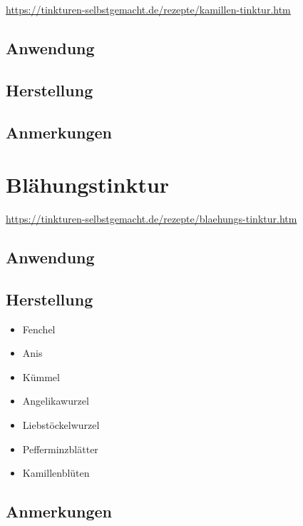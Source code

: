 
\cite{tinkturen}

\url{https://tinkturen-selbstgemacht.de/rezepte/kamillen-tinktur.htm}

\subsection{Anwendung}
\subsection{Herstellung}
\subsection{Anmerkungen}



\newpage



\section{Blähungstinktur}


\cite{tinkturen}  

\url{https://tinkturen-selbstgemacht.de/rezepte/blaehungs-tinktur.htm}

\subsection{Anwendung}

\subsection{Herstellung}
\begin{itemize}
	\item Fenchel
	\item Anis
	\item Kümmel
	\item Angelikawurzel
	\item Liebstöckelwurzel
	\item Pefferminzblätter
	\item Kamillenblüten
\end{itemize}

\subsection{Anmerkungen}



